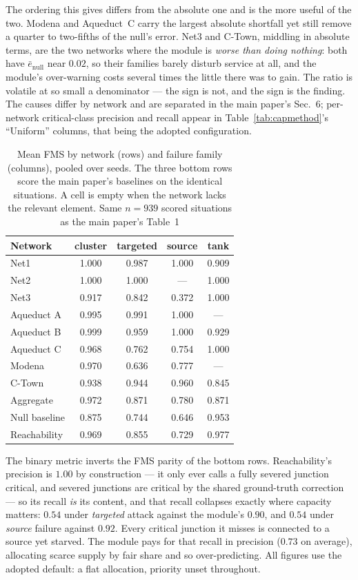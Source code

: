 \documentclass[11pt]{article}
\begin{document}
The ordering this gives differs from the absolute one and is the more useful of the
two. Modena and Aqueduct~C carry the largest absolute shortfall yet still remove a
quarter to two-fifths of the null's error. Net3 and C-Town, middling in absolute
terms, are the two networks where the module is \emph{worse than doing nothing}: both
have $\bar{e}_{\mathrm{null}}$ near $0.02$, so their families barely disturb service at
all, and the module's over-warning costs several times the little there was to gain.
The ratio is volatile at so small a denominator --- the sign is not, and the sign is
the finding. The causes differ by network and are separated in the main paper's Sec.~6;
per-network critical-class precision and recall appear in Table~\ref{tab:capmethod}'s
``Uniform'' columns, that being the adopted configuration.

\begin{table}[t]
\centering
\caption{Mean FMS by network (rows) and failure family (columns), pooled over
seeds. The three bottom rows score the main paper's baselines on the identical
situations. A cell is empty when the network lacks the relevant element. Same
$n=939$ scored situations as the main paper's Table~1}\label{tab:extended}
{%
\begin{tabular}{@{}lcccc@{}}
\toprule
Network & cluster & targeted & source & tank\\
\midrule
Net1        & 1.000 & 0.987 & 1.000 & 0.909\\
Net2        & 1.000 & 1.000 & ---   & 1.000\\
Net3        & 0.917 & 0.842 & 0.372 & 1.000\\
Aqueduct A  & 0.995 & 0.991 & 1.000 & ---  \\
Aqueduct B  & 0.999 & 0.959 & 1.000 & 0.929\\
Aqueduct C  & 0.968 & 0.762 & 0.754 & 1.000\\
Modena      & 0.970 & 0.636 & 0.777 & ---  \\
C-Town      & 0.938 & 0.944 & 0.960 & 0.845\\
\midrule
Aggregate     & 0.972 & 0.871 & 0.780 & 0.871\\
Null baseline & 0.875 & 0.744 & 0.646 & 0.953\\
Reachability  & 0.969 & 0.855 & 0.729 & 0.977\\
\bottomrule
\end{tabular}%
}
\end{table}

The binary metric inverts the FMS parity of the bottom rows. Reachability's
precision is $1.00$ by construction --- it only ever calls a fully severed
junction critical, and severed junctions are critical by the shared ground-truth
correction --- so its recall \emph{is} its content, and that recall collapses
exactly where capacity matters: $0.54$ under \emph{targeted} attack against the
module's $0.90$, and $0.54$ under \emph{source} failure against $0.92$. Every
critical junction it misses is connected to a source yet starved. The module pays
for that recall in precision ($0.73$ on average), allocating scarce supply by fair
share and so over-predicting. All figures use the adopted default: a flat
allocation, priority unset throughout.
\end{document}

